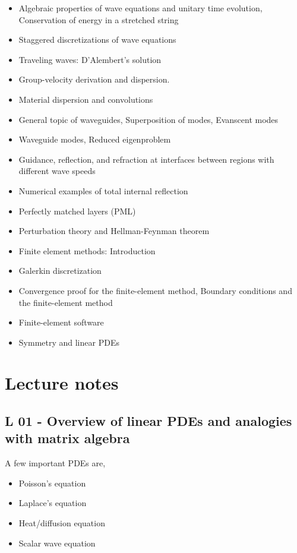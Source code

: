 \documentclass{article}
\theoremstyle{mytheoremstyle}
\theoremstyle{mytheoremstyle}
\theoremstyle{myproblemstyle}
\begin{document}
\begin{itemize}
	\item Algebraic properties of wave equations and unitary time
		evolution, Conservation of energy in a stretched string
	\item Staggered discretizations of wave equations
	\item Traveling waves: D'Alembert's solution
	\item Group-velocity derivation and dispersion.
	\item Material dispersion and convolutions
	\item General topic of waveguides, Superposition of modes,
		Evanscent modes
	\item Waveguide modes, Reduced eigenproblem
	\item Guidance, reflection, and refraction at interfaces between
		regions with different wave speeds
	\item Numerical examples of total internal reflection
	\item Perfectly matched layers (PML)
	\item Perturbation theory and Hellman-Feynman theorem
	\item Finite element methods: Introduction
	\item Galerkin discretization
	\item Convergence proof for the finite-element method, Boundary
		conditions and the finite-element method
	\item Finite-element software
	\item Symmetry and linear PDEs
    \end{itemize}

    \section{Lecture notes}
    \subsection{L 01 - Overview of linear PDEs and analogies with matrix algebra}

    \noindent A few important PDEs are,
    \begin{itemize}
    	\item Poisson's equation
	\item Laplace's equation
	\item Heat/diffusion equation
	\item Scalar wave equation
    \end{itemize}
\end{document}

